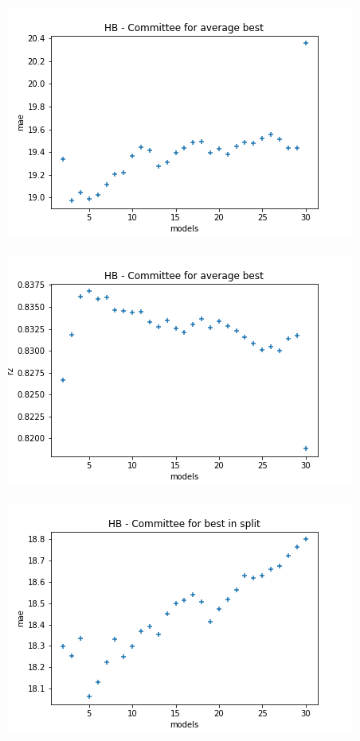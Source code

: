 \begin{figure}
     \centering
     \begin{subfigure}[b]{0.49\textwidth}
         \centering
         \includegraphics[width=\textwidth]{images/HB_avg_mae.png}
         \caption{}
         \label{fig:ea-avg-mae-hb}
     \end{subfigure}
     \begin{subfigure}[b]{0.49\textwidth}
         \centering
         \includegraphics[width=\textwidth]{images/HB_avg_r2.png}
         \caption{}
         \label{fig:ea-avg-r2-hb}
     \end{subfigure}
     \hfill
     \begin{subfigure}[b]{0.49\textwidth}
         \centering
         \includegraphics[width=\textwidth]{images/HB_split_mae.png}

\end{subfigure}
\end{figure}
